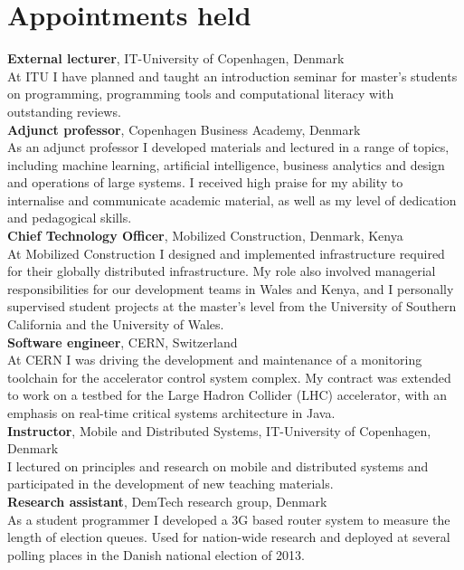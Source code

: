 \documentclass[11pt, a4paper]{article}
\newcommand{\years}[1]{\marginnote{\scriptsize #1}}
\begin{document}
\section*{Appointments held}
\noindent
\years{2018-}\textbf{External lecturer}, IT-University of Copenhagen, Denmark\\
At ITU I have planned and taught an introduction seminar for master's students
on programming, programming tools and computational literacy with outstanding reviews. \\[0.5cm]
\years{2016-}\textbf{Adjunct professor}, Copenhagen Business Academy,
Denmark\\
As an adjunct professor I developed materials and lectured in
a range of topics, including machine learning, artificial intelligence, business
analytics and design and operations of large systems.
I received high praise for my ability to internalise and communicate academic
material, as well as my level of dedication and pedagogical skills.\\[0.5cm]
\years{2016-2019}\textbf{Chief Technology Officer}, Mobilized Construction, Denmark, Kenya\\
At Mobilized Construction I designed and implemented infrastructure required for
their globally distributed infrastructure.
My role also involved managerial responsibilities for our development teams in 
Wales and Kenya, and I personally supervised student
projects at the master's level from the University of Southern
California and the University of Wales.\\[0.5cm]
\years{2014-2016}\textbf{Software engineer}, CERN, Switzerland\\
At CERN I was driving the development and maintenance of
a monitoring toolchain for the accelerator control system complex.
My contract was extended to work on a testbed for the Large Hadron
Collider (LHC) accelerator, with an emphasis on real-time critical
systems architecture in Java. \\[0.5cm]
\years{2013}\textbf{Instructor}, Mobile and Distributed Systems, IT-University of
Copenhagen, Denmark\\
I lectured on principles and research on mobile and distributed
systems and participated in the development of new teaching
materials. \\[0.5cm]
\years{2012-2014}\textbf{Research assistant}, DemTech research group, Denmark\\
As a student programmer I developed a 3G based router system to
measure the length of election queues. Used for nation-wide
research and deployed at several polling places in the Danish national
election of 2013.
\end{document}
